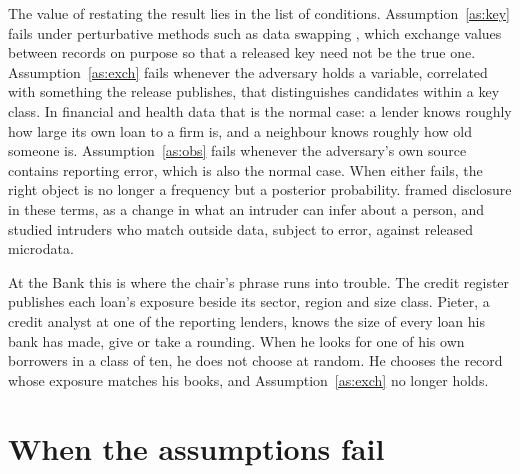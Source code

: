 The value of restating the result lies in the list of conditions. Assumption~\ref{as:key} fails under perturbative methods such as data swapping \citep{dalenius1982}, which exchange values between records on purpose so that a released key need not be the true one. Assumption~\ref{as:exch} fails whenever the
adversary holds a variable, correlated with something the release publishes, that
distinguishes candidates within a key class. In financial and health data that is
the normal case: a lender knows roughly how large its own loan to a firm is, and a
neighbour knows roughly how old someone is. Assumption~\ref{as:obs} fails whenever
the adversary's own source contains reporting error, which is also the normal case.
When either fails, the right object is no longer a frequency but a posterior probability. \citet{duncan1986} framed disclosure in these terms, as a change in what an intruder can infer about a person, and \citet{paass1988} studied intruders who match outside data, subject to error, against released microdata.

At the Bank this is where the chair's phrase runs into trouble. The credit register publishes
each loan's exposure beside its sector, region and size class. Pieter, a credit analyst at
one of the reporting lenders, knows the size of every loan his bank has made, give or take a
rounding. When he looks for one of his own borrowers in a class of ten, he does not choose at
random. He chooses the record whose exposure matches his books, and Assumption~\ref{as:exch}
no longer holds.

\section{When the assumptions fail}

